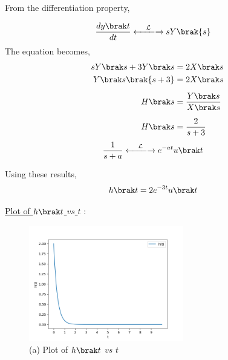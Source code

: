 \documentclass[journal,12pt,onecolumn]{IEEEtran}
\theoremstyle{remark}
\begin{document}
	
	\vspace{0.5cm}
	
	From the differentiation property,
	
	\begin{align}
		\dfrac{dy\brak t}{dt} &
		\xleftarrow[]{\hspace{0.4cm}{\mathcal{L}}\hspace{0.1cm}}\xrightarrow[]{}
		s Y\brak{s}
	\end{align}
	\vspace{0.4cm}
	The equation becomes,
	\begin{align}
		s Y\brak s + 3 Y\brak s &= 2 X\brak s\\
		Y\brak s \brak {s + 3} &= 2 X\brak s\\[5pt]
		H\brak s &= \dfrac{Y\brak s}{X\brak s}\\[5pt]
		H\brak s &= \dfrac{2}{s + 3}
	\end{align}
	\begin{align}
		\dfrac{1}{s + a} &
		\xleftarrow[]{\hspace{0.4cm}{\mathcal{L}}\hspace{0.1cm}}\xrightarrow[]{}
		e^{-at} u\brak t
	\end{align}
	
	Using these results,
	\begin{align}
		h\brak t &= 2 e^{-3t} u\brak t 
	\end{align}
	
	\vspace{0.2cm}
	
	\underline{Plot of $h\brak t$ $vs$ $t$} :
	
	\begin{figure}[htbp]
		\centering		
		\includegraphics[width=0.6\textwidth]{figs/figure1.png}
		\caption*{(a) Plot of $h\brak t$ $vs$ $t$}
		
	\end{figure}
\end{document}
